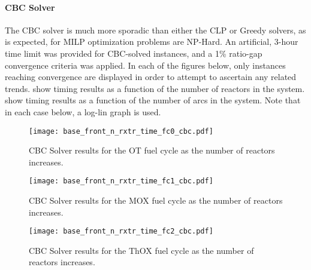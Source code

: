 \paragraph{CBC Solver}

The CBC solver is much more sporadic than either the CLP or Greedy solvers, as
is expected, for MILP optimization problems are NP-Hard. An artificial, 3-hour
time limit was provided for CBC-solved instances, and a 1\% ratio-gap
convergence criteria was applied. In each of the figures below, only instances
reaching convergence are displayed in order to attempt to ascertain any related
trends. 
show timing results as a function of the number of reactors in the
system. 
show timing results as a function of the number of arcs in the system. Note that
in each case below, a log-lin graph is used.

\begin{figure}[h!]
  \begin{center}
    \texttt{[image: base\_front\_n\_rxtr\_time\_fc0\_cbc.pdf]}
    \caption[]{
      \label{fig:base_front_n_rxtr_time_fc0_cbc}
      CBC Solver results for the OT fuel cycle as the number of reactors
      increases.
      }
  \end{center}
\end{figure}

\begin{figure}[h!]
  \begin{center}
    \texttt{[image: base\_front\_n\_rxtr\_time\_fc1\_cbc.pdf]}
    \caption[]{
      \label{fig:base_front_n_rxtr_time_fc1_cbc}
      CBC Solver results for the MOX fuel cycle as the number of reactors
      increases.
      }
  \end{center}
\end{figure}

\begin{figure}[h!]
  \begin{center}
    \texttt{[image: base\_front\_n\_rxtr\_time\_fc2\_cbc.pdf]}
    \caption[]{
      \label{fig:base_front_n_rxtr_time_fc2_cbc}
      CBC Solver results for the ThOX fuel cycle as the number of reactors
      increases.
      }
  \end{center}
\end{figure}

